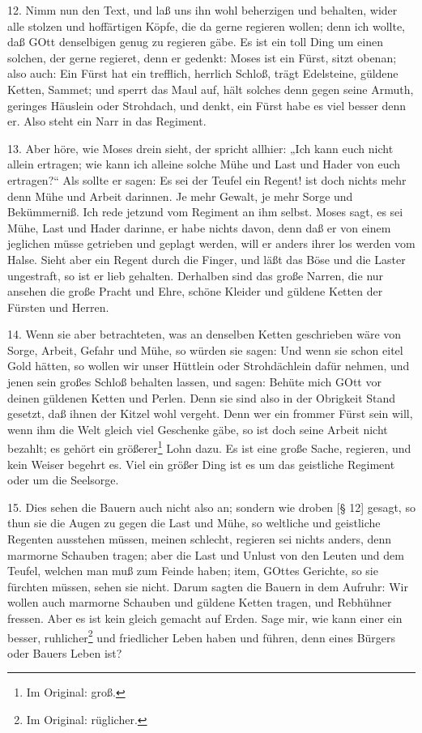 12. Nimm nun den Text, und laß uns ihn wohl beherzigen und behalten, wider alle stolzen und hoffärtigen Köpfe, die da gerne regieren wollen; denn ich wollte, daß GOtt denselbigen genug zu regieren gäbe. Es ist ein toll Ding um einen solchen, der gerne regieret, denn er gedenkt: Moses ist ein Fürst, sitzt obenan; also auch: Ein Fürst hat ein trefflich, herrlich Schloß, trägt Edelsteine, güldene Ketten, Sammet; und sperrt das Maul auf, hält solches denn gegen seine Armuth, geringes Häuslein oder Strohdach, und denkt, ein Fürst habe es viel besser denn er. Also steht ein Narr in das Regiment.

13. Aber höre, wie Moses drein sieht, der spricht allhier: „Ich kann euch nicht allein ertragen; wie kann ich alleine solche Mühe und Last und Hader von euch ertragen?“ Als sollte er sagen: Es sei der Teufel ein Regent! ist doch nichts mehr denn Mühe und Arbeit darinnen. Je mehr Gewalt, je mehr Sorge und Bekümmerniß. Ich rede jetzund vom Regiment an ihm selbst. Moses sagt, es sei Mühe, Last und Hader darinne, er habe nichts davon, denn daß er von einem jeglichen müsse getrieben und geplagt werden, will er anders ihrer los werden vom Halse. Sieht aber ein Regent durch die Finger, und läßt das Böse und die Laster ungestraft, so ist er lieb gehalten. Derhalben sind das große Narren, die nur ansehen die große Pracht und Ehre, schöne Kleider und güldene Ketten der Fürsten und Herren.

14. Wenn sie aber betrachteten, was an denselben Ketten geschrieben wäre von Sorge, Arbeit, Gefahr und Mühe, so würden sie sagen: Und wenn sie schon eitel Gold hätten, so wollen wir unser Hüttlein oder Strohdächlein dafür nehmen, und jenen sein großes Schloß behalten lassen, und sagen: Behüte mich GOtt vor deinen güldenen Ketten und Perlen. Denn sie sind also in der Obrigkeit Stand gesetzt, daß ihnen der Kitzel wohl vergeht. Denn wer ein frommer Fürst sein will, wenn ihm die Welt gleich viel Geschenke gäbe, so ist doch seine Arbeit nicht bezahlt; es gehört ein größerer\footnote{Im Original: groß.} Lohn
dazu. Es ist eine große Sache, regieren, und kein Weiser begehrt es. Viel ein größer Ding ist es um das geistliche Regiment oder um die Seelsorge.

15. Dies sehen die Bauern auch nicht also an; sondern wie droben [§ 12] gesagt, so thun sie die Augen zu gegen die Last und Mühe, so weltliche und geistliche Regenten ausstehen müssen, meinen schlecht, regieren sei nichts anders, denn marmorne Schauben tragen; aber die Last und Unlust von den Leuten und dem Teufel, welchen man muß zum Feinde haben; item, GOttes Gerichte, so sie fürchten müssen, sehen sie nicht. Darum sagten die Bauern in dem Aufruhr: Wir wollen auch marmorne Schauben und güldene Ketten tragen, und Rebhühner fressen. Aber es ist kein gleich gemacht auf Erden. Sage mir, wie kann einer ein besser, ruhlicher\footnote{Im Original: rüglicher.} und friedlicher Leben haben und führen, denn eines Bürgers oder Bauers Leben ist?

